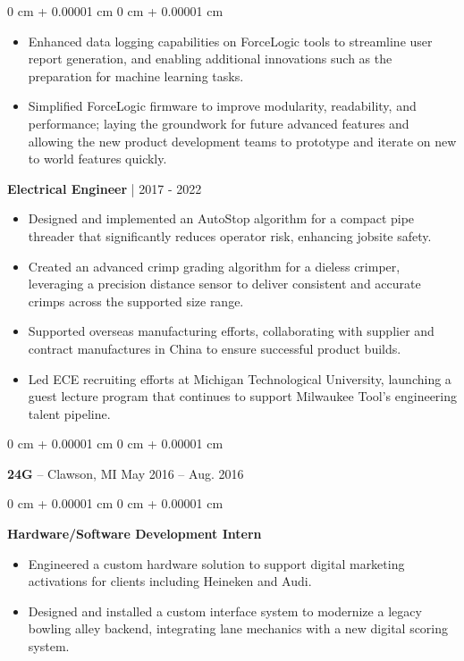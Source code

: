 \documentclass[10pt, letterpaper]{article}
\newenvironment{highlights}{
    \begin{itemize}[
        topsep=0.10 cm,
        parsep=0.10 cm,
        partopsep=0pt,
        itemsep=0pt,
        leftmargin=0 cm + 10pt
    ]
}{
    \end{itemize}
} %
\newenvironment{onecolentry}{
    \begin{adjustwidth}{
        0 cm + 0.00001 cm
    }{
        0 cm + 0.00001 cm
    }
}{
    \end{adjustwidth}
} %
\newenvironment{twocolentry}[2][]{
    \onecolentry
    \def\secondColumn{#2}
    \setcolumnwidth{\fill, 4.5 cm}
    \begin{paracol}{2}
}{
    \switchcolumn \raggedleft \secondColumn
    \end{paracol}
    \endonecolentry
} %
\begin{document}
\begin{onecolentry}
\begin{highlights}
                \item Enhanced data logging capabilities on ForceLogic tools to streamline user report generation, and enabling additional innovations such as the preparation for machine learning tasks.
                \item Simplified ForceLogic firmware to improve modularity, readability, and performance; laying the groundwork for future advanced features and allowing the new product development teams to prototype and iterate on new to world features quickly.
            \end{highlights}
        \textbf{Electrical Engineer} | 2017 - 2022
            \begin{highlights}
                \item Designed and implemented an AutoStop algorithm for a compact pipe threader that significantly reduces operator risk, enhancing jobsite safety.
                \item Created an advanced crimp grading algorithm for a dieless crimper, leveraging a precision distance sensor to deliver consistent and accurate crimps across the supported size range.
                \item Supported overseas manufacturing efforts, collaborating with supplier and contract manufactures in China to ensure successful product builds.
                \item Led ECE recruiting efforts at Michigan Technological University, launching a guest lecture program that continues to support Milwaukee Tool's engineering talent pipeline.
            \end{highlights}
        \end{onecolentry}

        \vspace{0.3 cm}

        \begin{twocolentry}{
            May 2016 – Aug. 2016
        }
            \textbf{24G} -- Clawson, MI\end{twocolentry}

        \vspace{0.10 cm}
        \begin{onecolentry}
        \textbf{Hardware/Software Development Intern}
            \begin{highlights}
                \item Engineered a custom hardware solution to support digital marketing activations for clients including Heineken and Audi. 
                \item Designed and installed a custom interface system to modernize a legacy bowling alley backend, integrating lane mechanics with a new digital scoring system.
            \end{highlights}
        \end{onecolentry}
\end{document}
